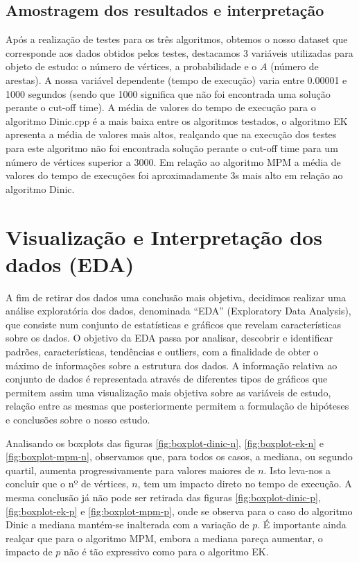\documentclass{uofa-eng-assignment}
\begin{document}
\subsection{Amostragem dos resultados e interpretação }

Após a realização de testes para os três algoritmos, obtemos o nosso dataset que corresponde aos dados obtidos pelos testes, destacamos  3 variáveis utilizadas para objeto de estudo: o número de vértices, a probabilidade e o $A$ (número de arestas). A nossa variável dependente (tempo de execução) varia entre 0.00001 e 1000 segundos (sendo que 1000 significa que não foi encontrada uma solução perante o cut-off time).
A média de valores do tempo de execução para o algoritmo Dinic.cpp é a mais baixa entre os algoritmos testados, o algoritmo EK apresenta a média de valores mais altos, realçando que na execução dos testes para este algoritmo não foi encontrada solução perante o cut-off time para um número de vértices superior a 3000.
Em relação ao algoritmo MPM a média de valores do tempo de execuções foi aproximadamente 3s mais alto em relação ao algoritmo Dinic.





\section{Visualização e Interpretação dos dados (EDA) }

A fim de retirar dos dados uma conclusão mais objetiva, decidimos realizar uma análise exploratória dos dados, denominada “EDA” (Exploratory Data Analysis), que consiste num conjunto de estatísticas e gráficos que revelam características sobre os dados. O objetivo da EDA passa por analisar, descobrir e identificar padrões, características, tendências e outliers, com a finalidade de obter o máximo de informações sobre a estrutura dos dados.
A informação relativa ao conjunto de dados é representada através de diferentes tipos de gráficos que permitem assim uma visualização  mais objetiva sobre as variáveis de estudo, relação entre as mesmas que posteriormente permitem a formulação de hipóteses e conclusões sobre o nosso estudo.

Analisando os boxplots das figuras \ref{fig:boxplot-dinic-n}, \ref{fig:boxplot-ek-n} e \ref{fig:boxplot-mpm-n}, observamos que, para todos os casos, a mediana, ou segundo quartil, aumenta progressivamente para valores maiores de $n$. Isto leva-nos a concluir que o nº de vértices, $n$, tem um impacto direto no tempo de execução. A mesma conclusão já não pode ser retirada das figuras \ref{fig:boxplot-dinic-p}, \ref{fig:boxplot-ek-p} e \ref{fig:boxplot-mpm-p}, onde se observa para o caso do algoritmo Dinic a mediana mantém-se inalterada com a variação de $p$. É importante ainda realçar que para o algoritmo MPM, embora a mediana pareça aumentar, o impacto de $p$ não é tão expressivo como para o algoritmo EK.
\end{document}
